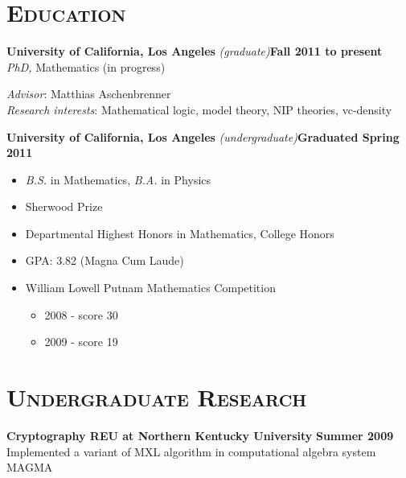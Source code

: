 \documentclass[margin, 10pt]{res} %
\begin{document}
\begin{resume}


\section{\textsc{Education}}

\textbf{University of California, Los Angeles} {\sl (graduate)}\hfill \textbf{Fall 2011 to present}\\
{\sl PhD,} Mathematics (in progress)

{\sl Advisor}: Matthias Aschenbrenner \\
{\sl Research interests}: Mathematical logic, model theory, NIP theories, vc-density

\textbf{University of California, Los Angeles} {\sl (undergraduate)}\hfill \textbf{Graduated Spring 2011}

\begin{itemize}
	\item {\sl B.S.} in Mathematics, {\sl B.A.} in Physics
	\item Sherwood Prize
	\item Departmental Highest Honors in Mathematics, College Honors
	\item GPA: 3.82 (Magna Cum Laude)
	\item William Lowell Putnam Mathematics Competition
		\begin{itemize}
			\item 2008 - score 30
			\item 2009 - score 19
		\end{itemize}
\end{itemize}


 
\section{\textsc{Undergraduate Research}}

\textbf{Cryptography REU at Northern Kentucky University} \hfill \textbf{Summer 2009}\\
Implemented a variant of MXL algorithm in computational algebra system MAGMA \\


\end{resume}
\end{document}
